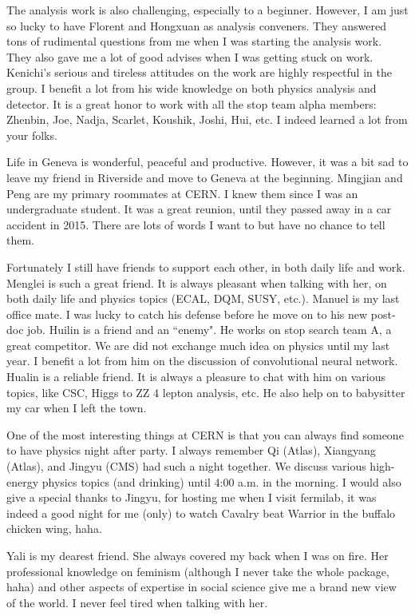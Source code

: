 \documentclass[oneside,final,letterpaper]{ucr}
\begin{document}
\begin{frontmatter}
\begin{acknowledgements}
The analysis work is also challenging, especially to a beginner. However, I am just so lucky to have Florent and Hongxuan as analysis conveners. They answered tons of rudimental questions from me when I was starting the analysis work. They also gave me a lot of good advises when I was getting stuck on work. Kenichi's serious and tireless attitudes on the work are highly respectful in the group. I benefit a lot from his wide knowledge on both physics analysis and detector. It is a great honor to work with all the stop team alpha members: Zhenbin, Joe, Nadja, Scarlet, Koushik, Joshi, Hui, etc. I indeed learned a lot from your folks. 

Life in Geneva is wonderful, peaceful and productive. However, it was a bit sad to leave my friend in Riverside and move to Geneva at the beginning. Mingjian and Peng are my primary roommates at CERN. I knew them since I was an undergraduate student. It was a great reunion, until they passed away in a car accident in 2015. There are lots of words I want to but have no chance to tell them. 

Fortunately I still have friends to support each other, in both daily life and work. Menglei is such a great friend. It is always pleasant when talking with her, on both daily life and physics topics (ECAL, DQM, SUSY, etc.). Manuel is my last office mate. I was lucky to catch his defense before he move on to his new post-doc job. Huilin is a friend and an ``enemy". He works on stop search team A, a great competitor. We are did not exchange much idea on physics until my last year. I benefit a lot from him on the discussion of convolutional neural network. Hualin is a reliable friend. It is always a pleasure to chat with him on various topics, like CSC, Higgs to ZZ 4 lepton analysis, etc. He also help on to babysitter my car when I left the town. 

One of the most interesting things at CERN is that you can always find someone to have physics night after party. I always remember Qi (Atlas), Xiangyang (Atlas), and Jingyu (CMS) had such a night together. We discuss various high-energy physics topics (and drinking) until 4:00 a.m. in the morning. I would also give a special thanks to Jingyu, for hosting me when I visit fermilab, it was indeed a good night for me (only) to watch Cavalry beat Warrior in the buffalo chicken wing, haha. 

Yali is my dearest friend. She always covered my back when I was on fire. Her professional knowledge on feminism (although I never take the whole package, haha) and other aspects of expertise in social science give me a brand new view of the world. I never feel tired when talking with her. 


\end{acknowledgements}
\end{frontmatter}
\end{document}
